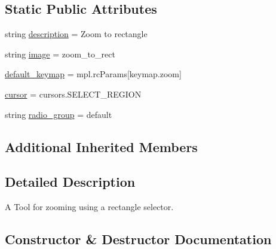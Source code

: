 \subsection*{Static Public Attributes}
\begin{DoxyCompactItemize}
\item 
string \hyperlink{classmatplotlib_1_1backend__tools_1_1ToolZoom_a11ad1978612456d88dd8bfe110cb136b}{description} = \textquotesingle{}Zoom to rectangle\textquotesingle{}
\item 
string \hyperlink{classmatplotlib_1_1backend__tools_1_1ToolZoom_a871f1f92c4f506f692a08eb7a00a65ba}{image} = \textquotesingle{}zoom\+\_\+to\+\_\+rect\textquotesingle{}
\item 
\hyperlink{classmatplotlib_1_1backend__tools_1_1ToolZoom_af6bb7bc8203294e9f2afbba47702bee8}{default\+\_\+keymap} = mpl.\+rc\+Params\mbox{[}\textquotesingle{}keymap.\+zoom\textquotesingle{}\mbox{]}
\item 
\hyperlink{classmatplotlib_1_1backend__tools_1_1ToolZoom_a2cf73fce7cea0383d8a5af47d0a1f5fb}{cursor} = cursors.\+S\+E\+L\+E\+C\+T\+\_\+\+R\+E\+G\+I\+ON
\item 
string \hyperlink{classmatplotlib_1_1backend__tools_1_1ToolZoom_a4bc0e84d9dc5fd5401766b2f5b9e11f5}{radio\+\_\+group} = \textquotesingle{}default\textquotesingle{}
\end{DoxyCompactItemize}
\subsection*{Additional Inherited Members}


\subsection{Detailed Description}
\begin{DoxyVerb}A Tool for zooming using a rectangle selector.\end{DoxyVerb}
 

\subsection{Constructor \& Destructor Documentation}
\mbox{\label{classmatplotlib_1_1backend__tools_1_1ToolZoom_a121732fe87e26263b61e7db094ad13fb}} 
